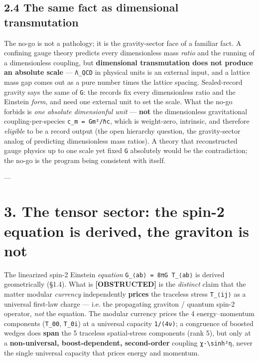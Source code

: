 \documentclass[11pt]{article}
\begin{document}
\subsection*{2.4 The same fact as dimensional transmutation}
The no-go is not a pathology; it is the gravity-sector face of a familiar fact. A confining gauge theory predicts every dimensionless mass \emph{ratio} and the running of a dimensionless coupling, but \textbf{dimensional transmutation does not produce an absolute scale} — \texttt{Λ\_QCD} in physical units is an external input, and a lattice mass gap comes out as a pure number times the lattice spacing. Sealed-record gravity says the same of \texttt{G}: the records fix every dimensionless ratio and the Einstein \emph{form}, and need one external unit to set the scale. What the no-go forbids is \emph{one absolute dimensionful unit} — \textbf{not} the dimensionless gravitational coupling-per-species \texttt{c\_m = Gm²/ℏc}, which is weight-zero, intrinsic, and therefore \emph{eligible} to be a record output (the open hierarchy question, the gravity-sector analog of predicting dimensionless mass ratios). A theory that reconstructed gauge physics up to one scale yet fixed \texttt{G} absolutely would be the contradiction; the no-go is the program being consistent with itself.

---

\section*{3. The tensor sector: the spin-2 equation is derived, the graviton is not}
The linearized spin-2 Einstein \emph{equation} \texttt{G\_{⟨ab⟩} = 8πG T\_{⟨ab⟩}} is derived geometrically (§1.4). What is \textbf{[OBSTRUCTED]} is the \emph{distinct} claim that the matter modular \emph{currency} independently \textbf{prices} the traceless stress \texttt{T\_{⟨ij⟩}} as a universal first-law charge — i.e. the propagating graviton / quantum spin-2 operator, \emph{not} the equation. The modular currency prices the 4 energy–momentum components (\texttt{T\_{00}}, \texttt{T\_{0i}}) at a universal capacity \texttt{1/(4ν)}; a congruence of boosted wedges does \textbf{span} the 5 traceless spatial-stress components (rank 5), but only at a \textbf{non-universal, boost-dependent, second-order} coupling \texttt{χ·\textbackslash{}sinh²η}, never the single universal capacity that prices energy and momentum.
\end{document}
